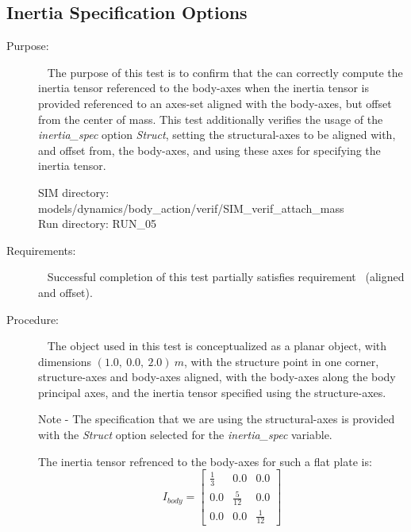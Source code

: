 \subsection{Inertia Specification Options}
\label{test:mass_05}
\begin{description}
\item[Purpose:] \ \newline
The purpose of this test is to confirm that the \ModelDesc
can correctly compute the inertia tensor referenced to the body-axes when the
inertia tensor is provided referenced to an axes-set aligned with the
body-axes, but offset from the center of mass.  This test additionally
verifies the usage of the \textit{inertia\_spec} option \textit{Struct},
setting the structural-axes to be aligned with, and offset from, the
body-axes, and using these axes for specifying the inertia tensor.

SIM directory: models/dynamics/body\_action/verif/SIM\_verif\_attach\_mass\\
Run directory: RUN\_05

\item[Requirements:] \ \newline
Successful completion of this test partially satisfies
requirement~ (aligned and offset).

\item[Procedure:]\ \newline
The object used in this test is conceptualized as a planar object, with
dimensions $(1.0, ~0.0, ~2.0) ~m$, with the structure point in one corner,
structure-axes and body-axes aligned, with the body-axes along the body
principal axes, and the inertia tensor specified using the structure-axes.

Note - The specification that we are using the structural-axes is provided
with the \textit{Struct} option selected for the \textit{inertia\_spec}
variable.


The inertia tensor refrenced to the body-axes for such a flat plate is:
\begin{equation*}
I_{body} =
   \begin{bmatrix} \frac{1}{3} & 0.0   & 0.0  \\
                   0.0   & \frac{5}{12} & 0.0   \\
                    0.0  & 0.0   & \frac{1}{12}
   \end{bmatrix}
\end{equation*}


\end{description}
